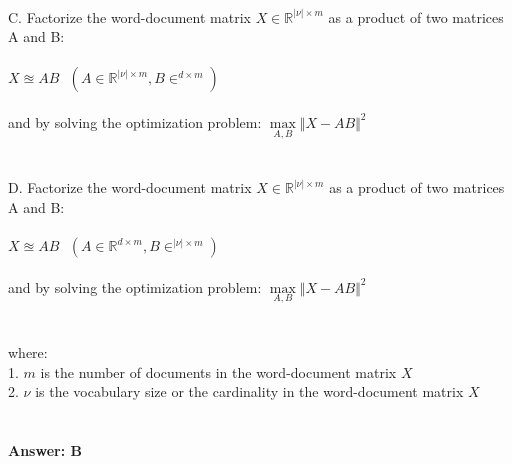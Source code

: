 \documentclass[prl,twocolumn,showpacs,preprintnumbers,superscriptaddress]{revtex4}
\theoremstyle{plain}
\theoremstyle{definition}
\begin{document}
\begin{widetext}
\\
C. Factorize the word-document matrix $X \in \mathbb{R}^{|\nu| \times m}$ as a product of two matrices A and B:
\\
\\
$X   \approxeq  AB\ \ \  (A \in \mathbb{R}^{|\nu| \times m}, B \in ^{d \times m} )$
\\
\\
and by solving the optimization problem: $\max\limits_{A, B} \Vert X - AB \Vert^2$
\\
\\
\\
D. Factorize the word-document matrix $X \in \mathbb{R}^{|\nu| \times m}$ as a product of two matrices A and B:
\\
\\
$X   \approxeq  AB\ \ \  (A \in \mathbb{R}^{d \times m}, B \in ^{|\nu| \times m} )$
\\
\\
and by solving the optimization problem: $\max\limits_{A, B} \Vert X - AB \Vert^2$
\\
\\
\\
where:
\\
1. $m$ is the number of documents in the word-document matrix $X$
\\
2. $\nu$ is the vocabulary size or the cardinality in the word-document matrix $X$
\\
\\
\\
\textbf{Answer: B}
\\
\\
\\
\\
\\
\\
\end{widetext}
\end{document}
